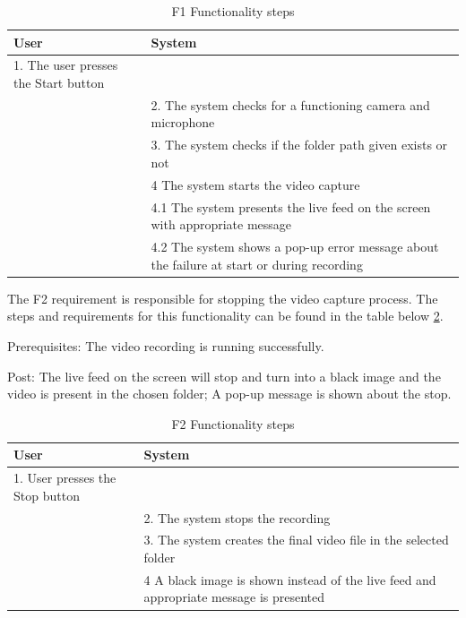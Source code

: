 \begin{table}[htbp]
\begin{center}
\begin{tabular}
{|p{180pt}|p{180pt}|}
\hline
 User & System\\
\hline 
\hline 1. The user presses the Start button &  \\
\hline  & 2. The system checks for a functioning camera and microphone \\
\hline  & 3. The system checks if the folder path given exists or not \\
\hline  & 4 The system starts the video capture \\
\hline  & 4.1 The system presents the live feed on the screen with appropriate message\\
\hline  & 4.2 The system shows a pop-up error message about the failure at start or during recording \\
\hline
\end{tabular}
\end{center}
\caption{F1 Functionality steps}
\label{F1Table}
\end{table}

\par The F2 requirement is responsible for stopping the video capture process. The steps and requirements for this functionality can be found in the table below \ref{F2Table}.
\par Prerequisites: The video recording is running successfully.
\par Post: The live feed on the screen will stop and turn into a black image and the video is present in the chosen folder; A pop-up message is shown about the stop.

\begin{table}[htbp]
\begin{center}
\begin{tabular}
{|p{180pt}|p{180pt}|}
\hline
 User & System\\
\hline 
\hline 1. User presses the Stop button &  \\
\hline  & 2. The system stops the recording \\
\hline  & 3. The system creates the final video file in the selected folder \\
\hline  & 4 A black image is shown instead of the live feed and appropriate message is presented\\
\hline
\end{tabular}
\end{center}
\caption{F2 Functionality steps}
\label{F2Table}
\end{table}

